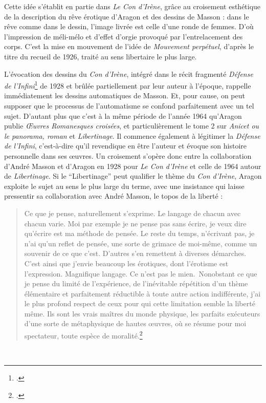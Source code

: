 Cette idée s’établit en partie dans \emph{Le Con d’Irène}, grâce au croisement esthétique de la description du rêve érotique d’Aragon et des dessins de Masson : dans le rêve comme dans le dessin, l’image livrée est celle d’une ronde de femmes. D’où l’impression de méli-mélo et d’effet d’orgie provoqué par l’entrelacement des corps. C’est la mise en mouvement de l’idée de \emph{Mouvement perpétuel}, d’après le titre du recueil de 1926, traité au sens libertaire le plus large.


L’évocation des dessins du \emph{Con d’Irène}, intégré dans le récit fragmenté \emph{Défense de l’Infini}\footcite{defense} de 1928 et brûlée partiellement par leur auteur à l’époque, rappelle immédiatement les dessins automatiques de Masson. Et, pour cause, on peut supposer que le processus de l’automatisme se confond parfaitement avec un tel sujet. D’autant plus que c’est à la même période de l’année 1964 qu’Aragon publie \emph{\OE{}uvres Romanesques croisées}, et particulièrement le tome 2 sur \emph{Anicet ou le panorama, roman} et \emph{Libertinage}. Il commence également à légitimer la \emph{Défense de l’Infini}, c’est-à-dire qu’il revendique en être l’auteur et évoque son histoire personnelle dans ses \oe{}uvres. Un croisement s’opère donc entre la collaboration d’André Masson et d’Aragon en 1928 pour \emph{Le Con d’Irène} et celle de 1964 autour de \emph{Libertinage}. Si le \enquote{Libertinage} peut qualifier le thème du \emph{Con d’Irène}, Aragon exploite le sujet au sens le plus large du terme, avec une insistance qui laisse pressentir sa collaboration avec André Masson, le topos de la liberté : 

\begin{quote}
Ce que je pense, naturellement s’exprime. Le langage de chacun avec chacun varie. Moi par exemple je ne pense pas sans écrire, je veux dire qu’écrire est ma méthode de pensée. Le reste du temps, n’écrivant pas, je n’ai qu’un reflet de pensée, une sorte de grimace de moi-même, comme un souvenir de ce que c’est. D’autres s’en remettent à diverses démarches. C’est ainsi que j’envie beaucoup les érotiques, dont l’érotisme est l’expression. Magnifique langage. Ce n’est pas le mien. Nonobstant ce que je pense du limité de l’expérience, de l’inévitable répétition d’un thème élémentaire et parfaitement réductible à toute autre action indifférente, j’ai le plus profond respect de ceux pour qui cette limitation semble la liberté même. Ils sont les vrais maîtres du monde physique, les parfaits exécuteurs d’une sorte de métaphysique de hautes \oe{}uvres, où se résume pour moi spectateur, toute espèce de moralité.\footcite[p266]{defense}	
\end{quote}
 


